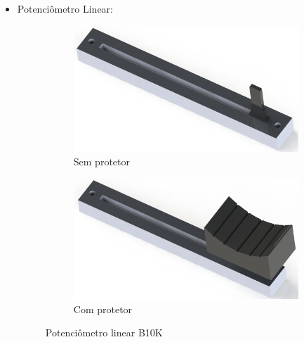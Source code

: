 \begin{itemize}
                \item Potenciômetro Linear:

                    \begin{figure}[H]
                        \centering
                        \begin{subfigure}{.5\textwidth}
                          \centering
                          \includegraphics[scale=0.13]{Imagens/SW_Images/sliding_pot_b10k_capa.png}
                          \caption{Sem protetor}
                          \label{fig:Linear_Potentiometer_without_protector}
                        \end{subfigure}%
                        \begin{subfigure}{.5\textwidth}
                          \centering
                          \includegraphics[scale=0.13]{Imagens/SW_Images/sliding_pot_b10k_montado.png}
                          \caption{Com protetor}
                          \label{fig:Linear_Potentiometer_with_protector}
                        \end{subfigure}
                        \caption{Potenciômetro linear B10K}
                        \label{fig:Linear_Potentiometer}
                    \end{figure}


\end{itemize}
